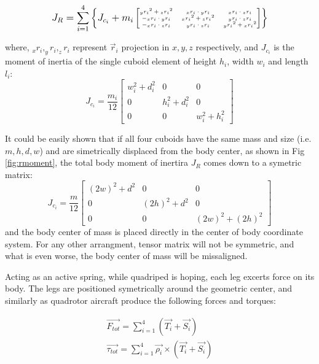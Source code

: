 \begin{equation}
\tiny
J_R=\sum_{i=1}^{4}\left \{J_{c_i}+m_i\begin{bmatrix}
{_yr_i}^2+{_zr_i}^2 & {_xr_i}\cdot {_yr_i} & {_xr_i}\cdot {_zr_i} \\ 
-{_xr_i}\cdot {_yr_i} & {_xr_i}^2+{_zr_i}^2 & {_yr_i}\cdot {_zr_i}\\ 
-{_xr_i}\cdot {_zr_i} & {_yr_i}\cdot {_zr_i} & {_yr_i}^2+{_xr_i}^2
\end{bmatrix} \right \}
\normalsize
\end{equation}

where, $_xr_i, _yr_i, _zr_i$ represent $\vec{r}_i$ projection in $x,y,z$ respectively, and $J_{c_i}$ is the moment of inertia of the single cuboid element of height $h_i$, width $w_i$ and length $l_i$:
\begin{equation}
J_{c_i}=\frac{m_i}{12}\begin{bmatrix}
w_i^2+d_i^2 &0&0 \\ 
0 &h_i^2+d_i^2&0\\ 
0 &0& w_i^2+h_i^2
\end{bmatrix}
\end{equation} 

It could be easily shown that if all four cuboids have the same mass and size (i.e. $m,h,d,w$) and are simetrically displaced from the body center, as shown in Fig \ref{fig:rmoment}, the total body moment of inertira $J_R$ comes down to a symetric matrix:
\begin{equation}
J_{c_i}=\frac{m}{12}\begin{bmatrix}
(2w)^2+d^2 &0&0 \\ 
0 &(2h)^2+d^2&0\\ 
0 &0& (2w)^2+(2h)^2
\end{bmatrix}
\end{equation} 
and the body center of mass is placed directly in the center of body coordinate system. For any other arrangment, tensor matrix will not be symmetric, and what is even worse, the body center of mass will be missaligned.

Acting as an active spring, while quadriped is hoping, each leg excerts force on its body. The legs are positioned symetrically around the geometric center, and similarly as quadrotor aircraft produce the following forces and torques:

\begin{gather}\label{eq:Forces}
\vec{F_{tot}}=\sum_{i=1}^{4}(\vec{T_{i}}+\vec{S_{i}})\\
\vec{\tau_{tot}}=\sum_{i=1}^{4}\vec{\rho _i}\times(\vec{T_{i}}+\vec{S_{i}})
\end{gather}  

